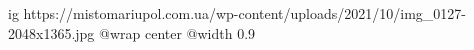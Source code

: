  
 
 
 
 

\ifcmt
  ig https://mistomariupol.com.ua/wp-content/uploads/2021/10/img_0127-2048x1365.jpg
  @wrap center
  @width 0.9
\fi
